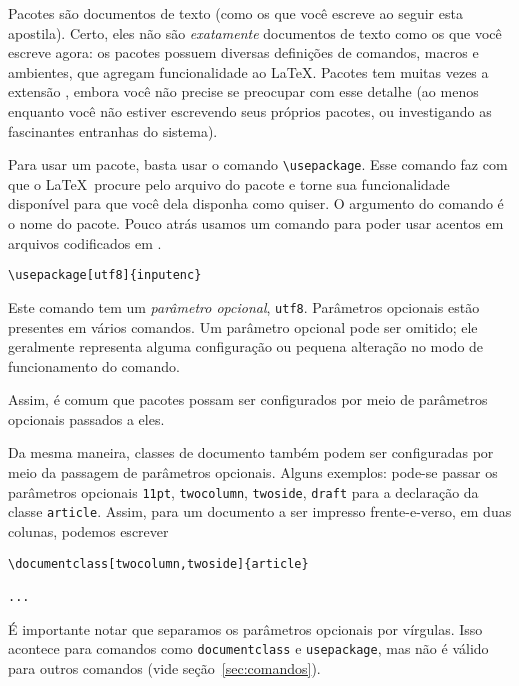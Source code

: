 Pacotes são documentos de texto (como os que você escreve ao seguir
esta apostila). Certo, eles não são \emph{exatamente} documentos de
texto como os que você escreve agora: os pacotes possuem diversas
definições de comandos, macros e ambientes, que agregam funcionalidade
ao \LaTeX. Pacotes tem muitas vezes a extensão , embora
você não precise se preocupar com esse detalhe (ao menos enquanto você
não estiver escrevendo seus próprios pacotes, ou investigando as
fascinantes entranhas do sistema).

Para usar um pacote, basta usar o comando \verb'\usepackage'. Esse
comando faz com que o \LaTeX\ procure pelo arquivo do pacote e torne
sua funcionalidade disponível para que você dela disponha como quiser.
O argumento do comando é o nome do pacote. Pouco atrás usamos um
comando para poder usar acentos em arquivos codificados em .
\begin{center}\footnotesize
\begin{verbatim}
\usepackage[utf8]{inputenc}
\end{verbatim}
\end{center}

Este comando tem um \emph{parâmetro opcional},
\texttt{utf8}. Parâmetros opcionais estão presentes em vários
comandos. Um parâmetro opcional pode ser omitido; ele geralmente
representa alguma configuração ou pequena alteração no modo de
funcionamento do comando.

Assim, é comum que pacotes possam ser configurados por meio de
parâmetros opcionais passados a eles.

Da mesma maneira, classes de documento também podem ser configuradas
por meio da passagem de parâmetros opcionais. Alguns exemplos: pode-se
passar os parâmetros opcionais \texttt{11pt}, \texttt{twocolumn},
\texttt{twoside}, \texttt{draft} para a declaração da classe
\texttt{article}. Assim, para um documento a ser impresso
frente-e-verso, em duas colunas, podemos escrever
\begin{footnotesize}
\begin{verbatim}
\documentclass[twocolumn,twoside]{article}

...

\end{verbatim}
\end{footnotesize}

É importante notar que separamos os parâmetros opcionais por
vírgulas. Isso acontece para comandos como \texttt{documentclass} e
\texttt{usepackage}, mas não é válido para outros comandos (vide
seção~\ref{sec:comandos}).

